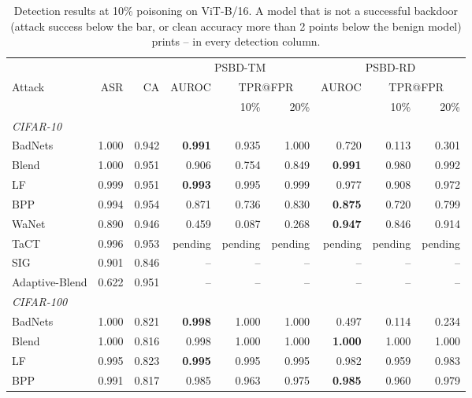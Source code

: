\begin{table}[htbp]
\centering
\small
\setlength{\tabcolsep}{4pt}
\caption{Detection results at 10\% poisoning on ViT-B/16. A model that is not a successful backdoor (attack success below the bar, or clean accuracy more than 2 points below the benign model) prints -- in every detection column.}
\label{tab:results-rate-10}
\begin{tabular}{lrrrrrrrr}
\toprule
 & & & \multicolumn{3}{c}{PSBD-TM} & \multicolumn{3}{c}{PSBD-RD} \\
\cmidrule(lr){4-6} \cmidrule(lr){7-9}
Attack & ASR & CA & AUROC & \multicolumn{2}{c}{TPR@FPR} & AUROC & \multicolumn{2}{c}{TPR@FPR} \\
\cmidrule(lr){5-6} \cmidrule(lr){8-9}
 & & & & 10\% & 20\% & & 10\% & 20\% \\
\midrule
\multicolumn{9}{l}{\textit{CIFAR-10}} \\
BadNets & 1.000 & 0.942 & \textbf{0.991} & 0.935 & 1.000 & 0.720 & 0.113 & 0.301 \\
Blend & 1.000 & 0.951 & 0.906 & 0.754 & 0.849 & \textbf{0.991} & 0.980 & 0.992 \\
LF & 0.999 & 0.951 & \textbf{0.993} & 0.995 & 0.999 & 0.977 & 0.908 & 0.972 \\
BPP & 0.994 & 0.954 & 0.871 & 0.736 & 0.830 & \textbf{0.875} & 0.720 & 0.799 \\
WaNet & 0.890 & 0.946 & 0.459 & 0.087 & 0.268 & \textbf{0.947} & 0.846 & 0.914 \\
TaCT & 0.996 & 0.953 & pending & pending & pending & pending & pending & pending \\
SIG & 0.901 & 0.846 & -- & -- & -- & -- & -- & -- \\
Adaptive-Blend & 0.622 & 0.951 & -- & -- & -- & -- & -- & -- \\
\midrule
\multicolumn{9}{l}{\textit{CIFAR-100}} \\
BadNets & 1.000 & 0.821 & \textbf{0.998} & 1.000 & 1.000 & 0.497 & 0.114 & 0.234 \\
Blend & 1.000 & 0.816 & 0.998 & 1.000 & 1.000 & \textbf{1.000} & 1.000 & 1.000 \\
LF & 0.995 & 0.823 & \textbf{0.995} & 0.995 & 0.995 & 0.982 & 0.959 & 0.983 \\
BPP & 0.991 & 0.817 & 0.985 & 0.963 & 0.975 & \textbf{0.985} & 0.960 & 0.979 \\

\end{tabular}
\end{table}
